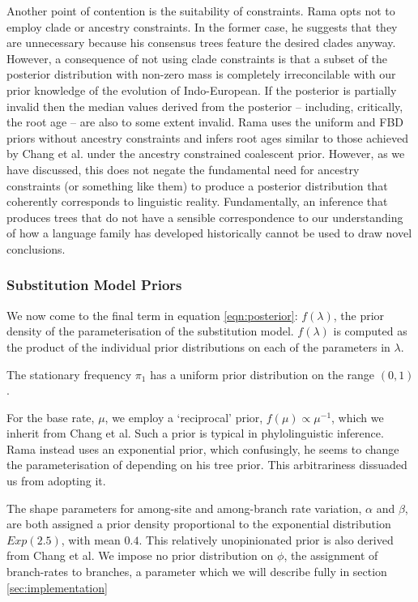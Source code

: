 \documentclass[10pt,journal,compsoc]{IEEEtran}
\begin{document}
Another point of contention is the suitability of constraints. Rama opts not to employ clade or ancestry constraints. In the former case, he suggests that they are unnecessary because his consensus trees feature the desired clades anyway. However, a consequence of not using clade constraints is that a subset of the posterior distribution with non-zero mass is completely irreconcilable with our prior knowledge of the evolution of Indo-European. If the posterior is partially invalid then the median values derived from the posterior -- including, critically, the root age -- are also to some extent invalid. Rama uses the uniform and FBD priors without ancestry constraints and infers root ages similar to those achieved by Chang et al. under the ancestry constrained coalescent prior. However, as we have discussed, this does not negate the fundamental need for ancestry constraints (or something like them) to produce a posterior distribution that coherently corresponds to linguistic reality. Fundamentally, an inference that produces trees that do not have a sensible correspondence to our understanding of how a language family has developed historically cannot be used to draw novel conclusions.

\subsubsection{Substitution Model Priors}

We now come to the final term in equation \eqref{eqn:posterior}: $f(\lambda)$, the prior density of the parameterisation of the substitution model. $f(\lambda)$ is computed as the product of the individual prior distributions on each of the parameters in $\lambda$.

The stationary frequency $\pi_1$ has a uniform prior distribution on the range $(0, 1)$.

For the base rate, $\mu$, we employ a `reciprocal' prior, $f(\mu) \propto \mu^{-1}$, which we inherit from Chang et al. Such a prior is typical in phylolinguistic inference. Rama instead uses an exponential prior, which confusingly, he seems to change the parameterisation of depending on his tree prior. This arbitrariness dissuaded us from adopting it.

The shape parameters for among-site and among-branch rate variation, $\alpha$ and $\beta$, are both assigned a prior density proportional to the exponential distribution $Exp(2.5)$, with mean $0.4$. This relatively unopinionated prior is also derived from Chang et al. We impose no prior distribution on $\phi$, the assignment of branch-rates to branches, a parameter which we will describe fully in section \ref{sec:implementation} 
\end{document}
